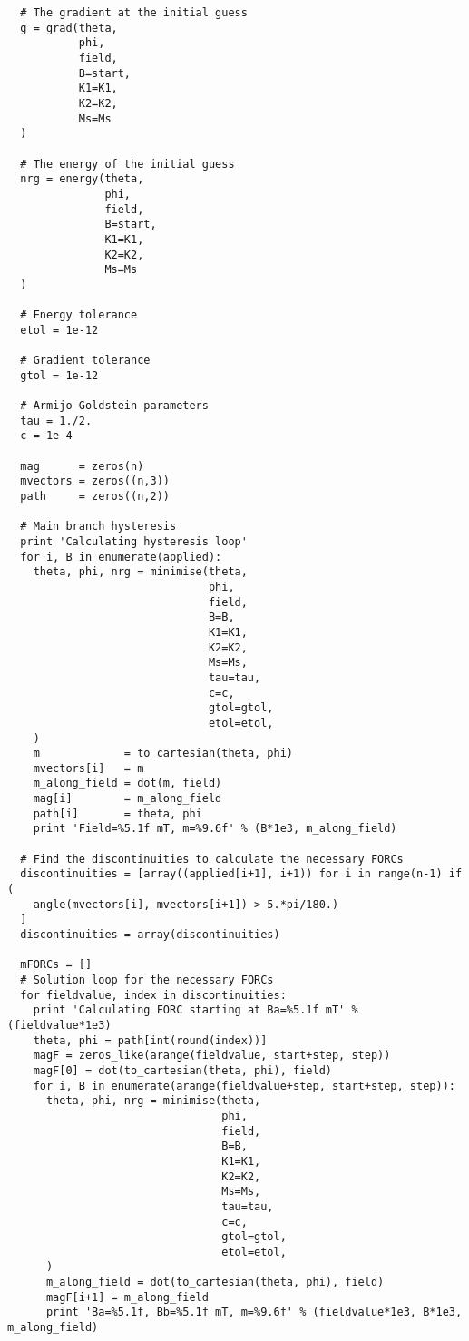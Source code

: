 \begin{lstlisting}
  # The gradient at the initial guess
  g = grad(theta,
           phi,
           field,
           B=start,
           K1=K1,
           K2=K2,
           Ms=Ms
  )

  # The energy of the initial guess
  nrg = energy(theta,
               phi,
               field,
               B=start,
               K1=K1,
               K2=K2,
               Ms=Ms
  )

  # Energy tolerance
  etol = 1e-12

  # Gradient tolerance
  gtol = 1e-12

  # Armijo-Goldstein parameters
  tau = 1./2.
  c = 1e-4

  mag      = zeros(n)
  mvectors = zeros((n,3))
  path     = zeros((n,2))

  # Main branch hysteresis
  print 'Calculating hysteresis loop'
  for i, B in enumerate(applied):
    theta, phi, nrg = minimise(theta,
                               phi,
                               field,
                               B=B,
                               K1=K1,
                               K2=K2,
                               Ms=Ms,
                               tau=tau,
                               c=c,
                               gtol=gtol,
                               etol=etol,
    )
    m             = to_cartesian(theta, phi)
    mvectors[i]   = m
    m_along_field = dot(m, field)
    mag[i]        = m_along_field
    path[i]       = theta, phi
    print 'Field=%5.1f mT, m=%9.6f' % (B*1e3, m_along_field)

  # Find the discontinuities to calculate the necessary FORCs
  discontinuities = [array((applied[i+1], i+1)) for i in range(n-1) if (
    angle(mvectors[i], mvectors[i+1]) > 5.*pi/180.)
  ]
  discontinuities = array(discontinuities)

  mFORCs = []
  # Solution loop for the necessary FORCs
  for fieldvalue, index in discontinuities:
    print 'Calculating FORC starting at Ba=%5.1f mT' % (fieldvalue*1e3)
    theta, phi = path[int(round(index))]
    magF = zeros_like(arange(fieldvalue, start+step, step))
    magF[0] = dot(to_cartesian(theta, phi), field)
    for i, B in enumerate(arange(fieldvalue+step, start+step, step)):
      theta, phi, nrg = minimise(theta,
                                 phi,
                                 field,
                                 B=B,
                                 K1=K1,
                                 K2=K2,
                                 Ms=Ms,
                                 tau=tau,
                                 c=c,
                                 gtol=gtol,
                                 etol=etol,
      )
      m_along_field = dot(to_cartesian(theta, phi), field)
      magF[i+1] = m_along_field
      print 'Ba=%5.1f, Bb=%5.1f mT, m=%9.6f' % (fieldvalue*1e3, B*1e3, m_along_field)


\end{lstlisting}

